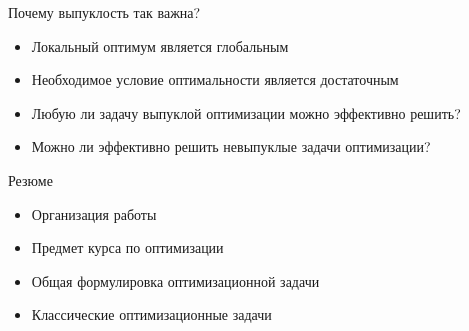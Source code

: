 \documentclass[12pt]{beamer}
\begin{document}
%
%

\begin{frame}{Почему выпуклость так важна?}
\begin{itemize}[<+->]
\item Локальный оптимум является глобальным
\item Необходимое условие оптимальности является достаточным
\end{itemize}
\begin{itemize}[<+->]
\item Любую ли задачу выпуклой оптимизации можно эффективно решить?
\item Можно ли эффективно решить невыпуклые задачи оптимизации?
\end{itemize}
\end{frame}

\begin{frame}{Резюме}
\begin{itemize}
\item Организация работы
\item Предмет курса по оптимизации
\item Общая формулировка оптимизационной задачи
\item Классические оптимизационные задачи
\end{itemize}
\end{frame}
\end{document}

